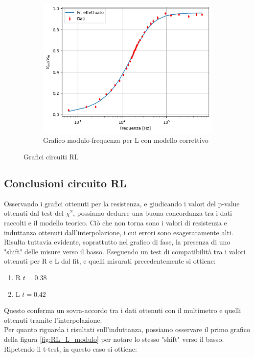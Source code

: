 \documentclass[letterpaper,12pt]{article}
\begin{document}
\begin{figure}[p]
    \begin{subfigure}[b]{0.45\textwidth}
        \centering
        \includegraphics[width=\textwidth]{RL_L_modulo_correttivi.png}
        \caption{Grafico modulo-frequenza per L con modello correttivo}
        \label{fig:RL_L_modulo_correttivi}
    \end{subfigure}
    \caption{Grafici circuiti RL}
    \label{fig:multi2}
\end{figure}

\subsection{Conclusioni circuito RL}
Osservando i grafici ottenuti per la resistenza, e giudicando i valori del p-value ottenuti dal test del $\chi^2$, possiamo dedurre una buona concordanza tra i dati raccolti e il modello teorico. Ciò che non torna sono i valori di resistenza e induttanza ottenuti dall'interpolazione, i cui errori sono esageratamente alti. \\
Risulta tuttavia evidente, soprattutto nel grafico di fase, la presenza di uno "shift" delle misure verso il basso. Eseguendo un test di compatibilità tra i valori ottenuti per R e L dal fit, e quelli misurati precedentemente si ottiene:
\begin{enumerate}
    \item R \quad  $t = 0.38$
    \item L \quad $t = 0.42$
\end{enumerate}
Questo conferma un sovra-accordo tra i dati ottenuti con il multimetro e quelli ottenuti tramite l'interpolazione. \\
Per quanto riguarda i risultati sull'induttanza, possiamo osservare il primo grafico della figura \ref{fig:RL_L_modulo} per notare lo stesso "shift" verso il basso. Ripetendo il t-test, in questo caso si ottiene:
\end{document}
